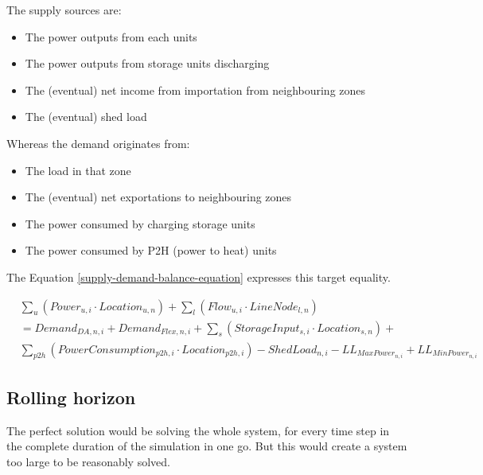 The supply sources are:
\begin{itemize}
    \item The power outputs from each units 
    \item The power outputs from storage units discharging
    \item The (eventual) net income from importation from neighbouring zones
    \item The (eventual) shed load
\end{itemize}

Whereas the demand originates from:
\begin{itemize}
    \item The load in that zone
    \item The (eventual) net exportations to neighbouring zones
    \item The power consumed by charging storage units
    \item The power consumed by P2H (power to heat) units
\end{itemize}

The Equation \ref{supply-demand-balance-equation} expresses this target equality.

\begin{captionnable}
    \begin{equation}
        \begin{split}
            &\sum_{u} (Power_{u,i} \cdot Location_{u,n}) + \sum_{l} (Flow_{u,i} \cdot LineNode_{l,n})\\
            & = Demand_{DA,n,i} + Demand_{Flex,n,i} + \sum_{s} (StorageInput_{s,i} \cdot Location_{s,n}) + \\
            & \sum_{p2h}(PowerConsumption_{p2h,i} \cdot Location_{p2h,i}) - ShedLoad_{n,i} - LL_{MaxPower_{n,i}} + LL_{MinPower_{n,i}} 		
        \end{split}
        \label{supply-demand-balance-equation}
    \end{equation}
\end{captionnable}

\subsection{Rolling horizon}

The perfect solution would be solving the whole system, for every time step in the complete duration of the simulation in one go. But this would create a system too large to be reasonably solved.

